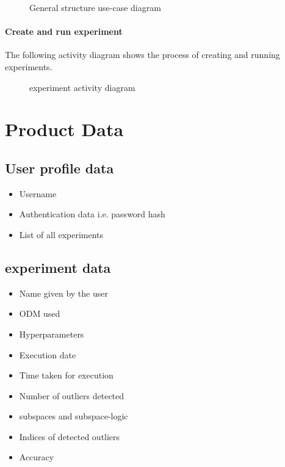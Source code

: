 \documentclass[11pt, english]{scrartcl}
\begin{document}
\begin{figure}[h!]
    \centering
    
    \caption{\label{fig:use-case-diagram}General structure use-case diagram}
\end{figure}

\paragraph{Create and run \gls{experiment}}
The following activity diagram shows the process of creating and running \glspl{experiment}.

\begin{figure}[h!t]
    \centering
    
    \caption{\label{fig:activity-diagram}\Gls{experiment} activity diagram}
\end{figure}

\newpage

\section{Product Data} 
\label{product-data}
\hypertarget{product-data}{}

\subsection*{User profile data}
\begin{itemize}
    \item Username
    \item Authentication data i.e. password hash
    \item List of all \glspl{experiment}
\end{itemize}

\subsection*{\Gls{experiment} data}
\begin{itemize}
    \item Name given by the user
    \item \Gls{ODM} used
    \item Hyperparameters
    \item Execution date
    \item Time taken for execution
    \item Number of outliers detected
    \item \Glspl{subspace} and \gls{subspace-logic}
    \item Indices of detected outliers
    \item Accuracy
\end{itemize}
\end{document}

